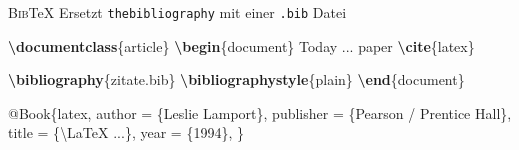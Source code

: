 \documentclass[aspectratio=169]{beamer}
\newenvironment{Shaded}{\begin{snugshade}}{\end{snugshade}}
\newcommand{\BuiltInTok}[1]{\textcolor[rgb]{0.25,0.67,0.19}{\textbf{#1}}}
\newcommand{\CharTok}[1]{\textcolor[rgb]{0.45,0.38,0.60}{#1}}
\newcommand{\DataTypeTok}[1]{\textcolor[rgb]{0.24,0.65,0.58}{#1}}
\newcommand{\ExtensionTok}[1]{\textcolor[rgb]{0.25,0.67,0.19}{#1}}
\newcommand{\KeywordTok}[1]{\textcolor[rgb]{0.25,0.67,0.19}{\textbf{#1}}}
\newcommand{\NormalTok}[1]{\textcolor[rgb]{0.19,0.19,0.19}{#1}}
\newcommand{\OtherTok}[1]{\textcolor[rgb]{0.19,0.19,0.19}{#1}}
\newcommand{\VariableTok}[1]{\textcolor[rgb]{0.44,0.55,0.28}{#1}}
\newenvironment{Shaded}{}{}
\newcommand\citestyle[1]{\textcolor{foreground-secondary}{\textsuperscript{#1}}}
\let\oldautocite\autocite
\renewcommand{\autocite}[1]{\citestyle{\oldautocite{#1}}}
\begin{document}
    \begin{frame}[fragile]{\textsc{Bib}\TeX}
    \protect\hypertarget{section}{}
    Ersetzt \texttt{thebibliography} mit einer \texttt{.bib} Datei
    \autocite{overleaf-bibtex}\\

    \begin{minipage}{0.495\textwidth}

\begin{Shaded}
\begin{Highlighting}[]
\BuiltInTok{\textbackslash{}documentclass}\NormalTok{\{}\ExtensionTok{article}\NormalTok{\}}
\KeywordTok{\textbackslash{}begin}\NormalTok{\{}\ExtensionTok{document}\NormalTok{\}}
\NormalTok{\textasciigrave{}\textasciigrave{}Today ... paper\textquotesingle{}\textquotesingle{} }
\KeywordTok{\textbackslash{}cite}\NormalTok{\{}\ExtensionTok{latex}\NormalTok{\}}

\BuiltInTok{\textbackslash{}bibliography}\NormalTok{\{}\ExtensionTok{zitate.bib}\NormalTok{\}}
\BuiltInTok{\textbackslash{}bibliographystyle}\NormalTok{\{}\ExtensionTok{plain}\NormalTok{\}}
\KeywordTok{\textbackslash{}end}\NormalTok{\{}\ExtensionTok{document}\NormalTok{\}}
\end{Highlighting}
\end{Shaded}

    \end{minipage}\begin{minipage}{0.01\textwidth}

    \phantom{x}

    \end{minipage}\begin{minipage}{0.495\textwidth}

\begin{Shaded}
\begin{Highlighting}[]
\VariableTok{@Book}\NormalTok{\{}\OtherTok{latex}\NormalTok{,}
  \DataTypeTok{author}\NormalTok{ = \{Leslie Lamport\},}
  \DataTypeTok{publisher}\NormalTok{ = \{Pearson }
\NormalTok{      / Prentice Hall\},}
  \DataTypeTok{title}\NormalTok{ = \{}\CharTok{\textbackslash{}LaTeX}\NormalTok{ ...\},}
  \DataTypeTok{year}\NormalTok{ = \{1994\},}
\NormalTok{\}}
\end{Highlighting}
\end{Shaded}

    \centering{\textcolor{foreground-secondary}{\scriptsize zitate.bib}}

    \end{minipage}


\end{frame}
\end{document}
